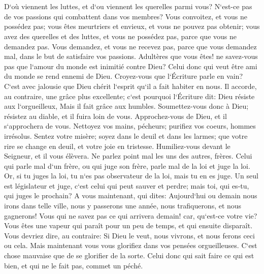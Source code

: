 \chapter{}

\verse D`où viennent les luttes, et d`ou viennent les querelles parmi vous? N`est-ce pas de vos passions qui combattent dans vos membres? 
\verse Vous convoitez, et vous ne possédez pas; vous êtes meurtriers et envieux, et vous ne pouvez pas obtenir; vous avez des querelles et des luttes, et vous ne possédez pas, parce que vous ne demandez pas. 
\verse Vous demandez, et vous ne recevez pas, parce que vous demandez mal, dans le but de satisfaire vos passions. 
\verse Adultères que vous êtes! ne savez-vous pas que l`amour du monde est inimitié contre Dieu? Celui donc qui veut être ami du monde se rend ennemi de Dieu. 
\verse Croyez-vous que l`Écriture parle en vain? C`est avec jalousie que Dieu chérit l`esprit qu`il a fait habiter en nous. 
\verse Il accorde, au contraire, une grâce plus excellente; c`est pourquoi l`Écriture dit: Dieu résiste aux l`orgueilleux, Mais il fait grâce aux humbles. 
\verse Soumettez-vous donc à Dieu; résistez au diable, et il fuira loin de vous. 
\verse Approchez-vous de Dieu, et il s`approchera de vous. Nettoyez vos mains, pécheurs; purifiez vos coeurs, hommes irrésolus. 
\verse Sentez votre misère; soyez dans le deuil et dans les larmes; que votre rire se change en deuil, et votre joie en tristesse. 
\verse Humiliez-vous devant le Seigneur, et il vous élèvera. 
\verse Ne parlez point mal les uns des autres, frères. Celui qui parle mal d`un frère, ou qui juge son frère, parle mal de la loi et juge la loi. Or, si tu juges la loi, tu n`es pas observateur de la loi, mais tu en es juge. 
\verse Un seul est législateur et juge, c`est celui qui peut sauver et perdre; mais toi, qui es-tu, qui juges le prochain? 
\verse A vous maintenant, qui dites: Aujourd`hui ou demain nous irons dans telle ville, nous y passerons une année, nous trafiquerons, et nous gagnerons! 
\verse Vous qui ne savez pas ce qui arrivera demain! car, qu`est-ce votre vie? Vous êtes une vapeur qui paraît pour un peu de temps, et qui ensuite disparaît. 
\verse Vous devriez dire, au contraire: Si Dieu le veut, nous vivrons, et nous ferons ceci ou cela. 
\verse Mais maintenant vous vous glorifiez dans vos pensées orgueilleuses. C`est chose mauvaise que de se glorifier de la sorte. 
\verse Celui donc qui sait faire ce qui est bien, et qui ne le fait pas, commet un péché. 

\chapter{}

